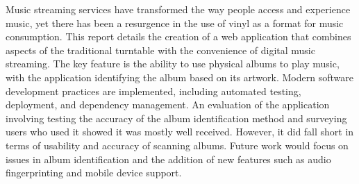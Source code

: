 %
{\singlespacing

Music streaming services have transformed the way people access and experience music, yet there has been a resurgence in the use of vinyl as a format for music consumption. This report details the creation of a web application that combines aspects of the traditional turntable with the convenience of digital music streaming. The key feature is the ability to use physical albums to play music, with the application identifying the album based on its artwork. Modern software development practices are implemented, including automated testing, deployment, and dependency management. An evaluation of the application involving testing the accuracy of the album identification method and surveying users who used it showed it was mostly well received. However, it did fall short in terms of usability and accuracy of scanning albums. Future work would focus on issues in album identification and the addition of new features such as audio fingerprinting and mobile device support.
}
